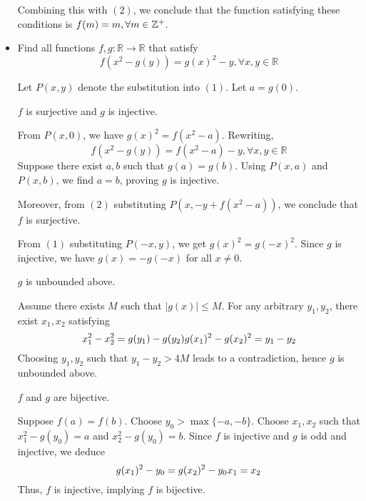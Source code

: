 \documentclass[11pt]{scrartcl}
\begin{document}
\begin{itemize}[label=, leftmargin=0em, itemsep=0.2em]
\begin{sol}
        Combining this with $(2)$, we conclude that the function satisfying these conditions is $f(m) = m, \forall m \in \mathbb{Z^+}$.

    \end{sol}

    \item \begin{bt}
        Find all functions $f,g: \mathbb{R} \to \mathbb{R}$ that satisfy
    $$f(x^2-g(y))=g(x)^2-y, \forall x,y \in \mathbb{R}$$
    \end{bt}
    \begin{sol}
        Let $P(x,y)$ denote the substitution into $(1)$. Let $a = g(0)$.

         $f$ is surjective and $g$ is injective.
        \begin{pro}
            From $P(x,0)$, we have $g(x)^2 = f(x^2 - a)$. Rewriting,
            \[
                f(x^2 - g(y)) = f(x^2 - a) - y, \forall x,y \in \mathbb{R} \tag{2}
            \]
            Suppose there exist $a, b$ such that $g(a) = g(b)$. Using $P(x,a)$ and $P(x,b)$, we find $a = b$, proving $g$ is injective.

            Moreover, from $(2)$ substituting $P(x, -y + f(x^2 - a))$, we conclude that $f$ is surjective.

            From $(1)$ substituting $P(-x,y)$, we get $g(x)^2 = g(-x)^2$. Since $g$ is injective, we have $g(x) = -g(-x)$ for all $x \neq 0$.
        \end{pro}

         $g$ is unbounded above.
        \begin{pro}
            Assume there exists $M$ such that $|g(x)| \leq M$. For any arbitrary $y_1, y_2$, there exist $x_1, x_2$ satisfying
            \[
                x_1^2 - x_2^2 = g(y_1) - g(y_2) \ra g(x_1)^2 - g(x_2)^2 = y_1 - y_2
            \]
            Choosing $y_1, y_2$ such that $y_1 - y_2 > 4M$ leads to a contradiction, hence $g$ is unbounded above.
        \end{pro}

         $f$ and $g$ are bijective.
        \begin{pro}
            Suppose $f(a) = f(b)$. Choose $y_0 > \max\{-a, -b\}$. Choose $x_1, x_2$ such that $x_1^2 - g(y_0) = a$ and $x_2^2 - g(y_0) = b$. Since $f$ is injective and $g$ is odd and injective, we deduce
            \[
                g(x_1)^2 - y_0 = g(x_2)^2 - y_0 \ra x_1 = x_2
            \]
            Thus, $f$ is injective, implying $f$ is bijective.


\end{pro}
\end{sol}
\end{itemize}
\end{document}
